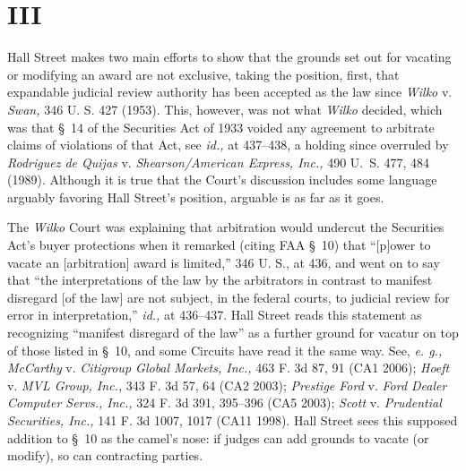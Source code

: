 \section{III}

  Hall Street makes two main efforts to show that the grounds set
out for vacating or modifying an award are not exclusive, taking
the position, first, that expandable judicial review authority has
been accepted as the law since \emph{Wilko} v. \emph{Swan,} 346 U. S.
427 (1953). This, however, was not what \emph{Wilko} decided, which
was that \S~14 of the Securities Act of 1933 voided any agreement
to arbitrate claims of violations of that Act, see \emph{id.,} at
437--438, a holding since overruled by \emph{Rodriguez de Quijas}
v. \emph{Shearson/American Express, Inc.,} 490 U.~S. 477, 484 (1989).
Although it is true that the Court's discussion includes some language
arguably favoring Hall Street's position, arguable is as far as it
goes.

  The \emph{Wilko} Court was explaining that arbitration would undercut
the Securities Act's buyer protections when it remarked (citing FAA
\S~10) that ``[p]ower to vacate an [arbitration] award is limited,''
346 U. S., at 436, and went on to say that ``the interpretations of
the law by the arbitrators in contrast to manifest disregard [of the
law] are not subject, in the federal courts, to judicial review for
error in interpretation,'' \emph{id.,} at 436--437. Hall Street
reads this statement as recognizing ``manifest disregard of the law''
as a further ground for vacatur on top of those listed in \S~10, and
some Circuits have read it the same way. See, \emph{e. g., McCarthy}
v. \newpage  \emph{Citigroup Global Markets, Inc.,} 463 F. 3d 87, 91 (CA1
2006); \emph{Hoeft} v. \emph{MVL Group, Inc.,} 343 F. 3d 57, 64 (CA2 2003);
\emph{Prestige Ford} v. \emph{Ford Dealer Computer Servs., Inc.,} 324 F. 3d
391, 395--396 (CA5 2003); \emph{Scott} v. \emph{Prudential Securities, Inc.,}
141 F. 3d 1007, 1017 (CA11 1998). Hall Street sees this supposed
addition to \S~10 as the camel's nose: if judges can add grounds to
vacate (or modify), so can contracting parties.


